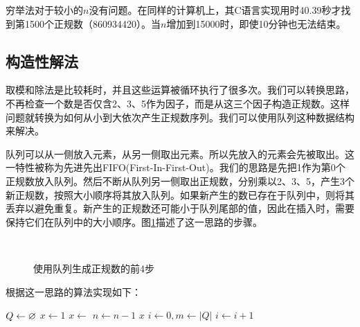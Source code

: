 \documentclass[b5paper]{ctexart}
\begin{document}
穷举法对于较小的$n$没有问题。在同样的计算机上，其C语言实现用时40.39秒才找到第1500个正规数（860934420）。当$n$增加到15000时，即使10分钟也无法结束。

\subsection*{构造性解法}
取模和除法是比较耗时\cite{Bentley}，并且这些运算被循环执行了很多次。我们可以转换思路，不再检查一个数是否仅含2、3、5作为因子，而是从这三个因子构造正规数。这样问题就转换为如何从小到大依次产生正规数序列。我们可以使用队列这种数据结构来解决。

队列可以从一侧放入元素，从另一侧取出元素。所以先放入的元素会先被取出。这一特性被称为先进先出FIFO(First-In-First-Out)。我们的思路是先把1作为第0个正规数放入队列。然后不断从队列另一侧取出正规数，分别乘以2、3、5，产生3个新正规数，按照大小顺序将其放入队列。如果新产生的数已存在于队列中，则将其丢弃以避免重复。新产生的正规数还可能小于队列尾部的值，因此在插入时，需要保持它们在队列中的大小顺序。图\ref{fig:queues}描述了这一思路的步骤。

\begin{figure}[htbp]
  \centering
  \hspace{.1\textwidth}
  \\
  \hspace{.1\textwidth}
  \caption{使用队列生成正规数的前4步} \label{fig:queues}
\end{figure}

根据这一思路的算法实现如下：

\begin{algorithmic}[1]
  \State $Q \gets \varnothing$
  \State $x \gets 1$
  \State {}
    \State $x \gets$ 
    \State {}
    \State {}
    \State {}
    \State $n \gets n-1$
  \EndWhile
  \State \Return $x$
\EndFunction
\Statex
{}
  \State $i \gets 0, m \gets |Q|$
    \State $i \gets i + 1$
  \EndWhile
    \State {}
  \EndIf
\EndFunction
\end{algorithmic}
\end{document}
